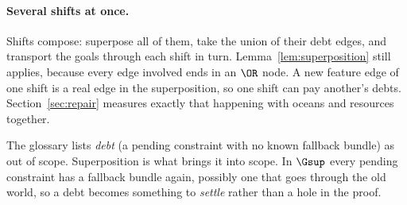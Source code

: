 \paragraph{Several shifts at once.} Shifts compose: superpose all of them, take the union of their debt edges, and transport the goals through each shift in turn. Lemma~\ref{lem:superposition} still applies, because every edge involved ends in an $\OR$ node. A new feature edge of one shift is a real edge in the superposition, so one shift can pay another's debts. Section~\ref{sec:repair} measures exactly that happening with oceans and resources together.

The glossary lists \emph{debt} (a pending constraint with no known fallback bundle) as out of scope. Superposition is what brings it into scope. In $\Gsup$ every pending constraint has a fallback bundle again, possibly one that goes through the old world, so a debt becomes something to \emph{settle} rather than a hole in the proof.
